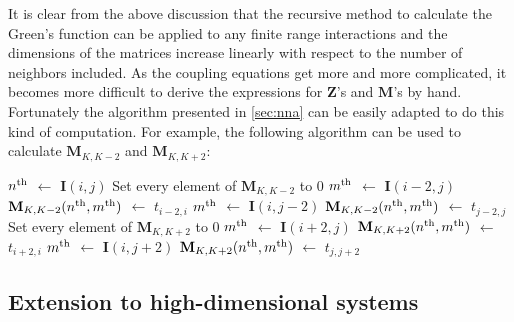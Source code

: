 It is clear from the above discussion that the recursive method to calculate the Green's function can be applied to 
any finite range interactions and the dimensions of the matrices increase linearly with respect to the number of 
neighbors included. As the coupling equations get more and more complicated, it becomes more difficult to derive 
the expressions for $\mathbf{Z}$'s and $\mathbf{M}$'s by hand. Fortunately the algorithm presented in 
\autoref{sec:nna} can be easily adapted to do this kind of computation. For example, the following algorithm can
be used to calculate $\mathbf{M}_{K,K-2}$ and $\mathbf{M}_{K,K+2}$:
\begin{algorithmic}[1]
     \State $n^{\rm th}$ $\gets$ $\mathbf{I}(i,j)$
     \State Set every element of $\mathbf{M}_{K,K-2}$ to 0
                   \State $m^{\rm th}$ $\gets$ $ \mathbf{I}(i-2, j)$  
                   \State $\mathbf{M}_{K,K-2}(n^{\rm th}, m^{\rm th})$ $\gets$ $t_{i-2, i}$
       \EndIf
%
                   \State $m^{\rm th}$ $\gets$ $ \mathbf{I}(i, j-2)$  
                   \State $\mathbf{M}_{K,K-2}(n^{\rm th}, m^{\rm th})$ $\gets$ $t_{j-2, j}$
       \EndIf
        \State Set every element of $\mathbf{M}_{K,K+2}$ to 0
                   \State $m^{\rm th}$ $\gets$ $ \mathbf{I}(i+2, j)$  
                   \State $\mathbf{M}_{K,K+2}(n^{\rm th}, m^{\rm th})$ $\gets$ $t_{i+2, i}$ 
       \EndIf
%
                   \State $m^{\rm th}$ $\gets$ $ \mathbf{I}(i, j+2)$  
                   \State $\mathbf{M}_{K,K+2}(n^{\rm th}, m^{\rm th})$ $\gets$ $t_{j, j+2}$
       \EndIf
\EndFor
\end{algorithmic}


\subsection{Extension to high-dimensional systems}
\label{sec:high-dimension}

